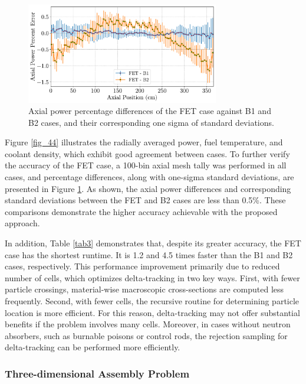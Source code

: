 \begin{figure}
    \centering
    \includegraphics[width=0.75\textwidth]{figs/axial_diff.pdf}
    \caption[Axial power percentage differences of the FET case]{Axial power percentage differences of the FET case against B1 and B2 cases, and their corresponding one sigma of standard deviations.}
    \label{fig_45}
\end{figure}

Figure \ref{fig_44} illustrates the radially averaged power, fuel temperature, and coolant density, which exhibit good agreement between cases. To further verify the accuracy of the FET case, a 100-bin axial mesh tally was performed in all cases, and percentage differences, along with one-sigma standard deviations, are presented in Figure \ref{fig_45}. As shown, the axial power differences and corresponding standard deviations between the FET and B2 cases are less than 0.5\%. These comparisons demonstrate the higher accuracy achievable with the proposed approach.

In addition, Table \ref{tab3} demonstrates that, despite its greater accuracy, the FET case has the shortest runtime. It is 1.2 and 4.5 times faster than the B1 and B2 cases, respectively. This performance improvement primarily due to reduced number of cells, which optimizes delta-tracking in two key ways. First, with fewer particle crossings, material-wise macroscopic cross-sections are computed less frequently. Second, with fewer cells, the recursive routine for determining particle location is more efficient. For this reason, delta-tracking may not offer substantial benefits if the problem involves many cells. Moreover, in cases without neutron absorbers, such as burnable poisons or control rods, the rejection sampling for delta-tracking can be performed more efficiently.

\subsubsection{Three-dimensional Assembly Problem} \label{3d_asm}

